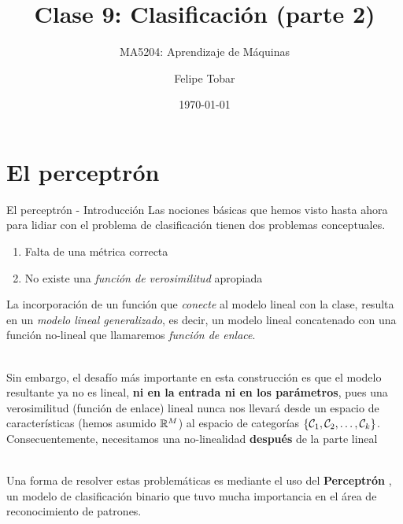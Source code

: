 \documentclass[handout, 9pt]{beamer}
\title{Clase 9: Clasificación (parte 2)}
\subtitle{MA5204: Aprendizaje de Máquinas}
\date{\today}
\author{Felipe Tobar}
\institute{Department of Mathematical Engineering \&\\ Center for Mathematical Modelling\\Universidad de Chile}
\begin{document}
\begin{frame}
  \titlepage
\end{frame}

\section{El perceptrón}

\begin{frame}{El perceptrón - Introducción}
Las nociones básicas que hemos visto hasta ahora para lidiar con el problema de clasificación tienen dos problemas conceptuales. \pause
\begin{enumerate}
  \item Falta de una métrica correcta \pause
  \item No existe una \emph{función de verosimilitud} apropiada \pause
\end{enumerate}

La incorporación de un función que \emph{conecte} al modelo lineal con la clase, resulta en un \emph{modelo lineal generalizado}, es decir, un modelo lineal concatenado con una función no-lineal que llamaremos \emph{función de enlace}.\\~\ \pause

Sin embargo, el desafío más importante en esta construcción es que el modelo resultante ya no es lineal, \textbf{ni en la entrada ni en los parámetros}, pues una verosimilitud (función de enlace) lineal nunca nos llevará desde un espacio de características  (hemos asumido $\mathbb{R}^M$) al espacio de categorías $\{{\mathcal C}_1,{\mathcal C}_2,\ldots,{\mathcal C}_k\}$. Consecuentemente, necesitamos una no-linealidad \textbf{después} de la parte lineal \\~\

Una forma de resolver estas problemáticas es mediante el uso del \textbf{Perceptrón} \cite{rosenblatt_1958}, un modelo de clasificación binario que tuvo mucha importancia en el área de reconocimiento de patrones.

\end{frame}
\end{document}
